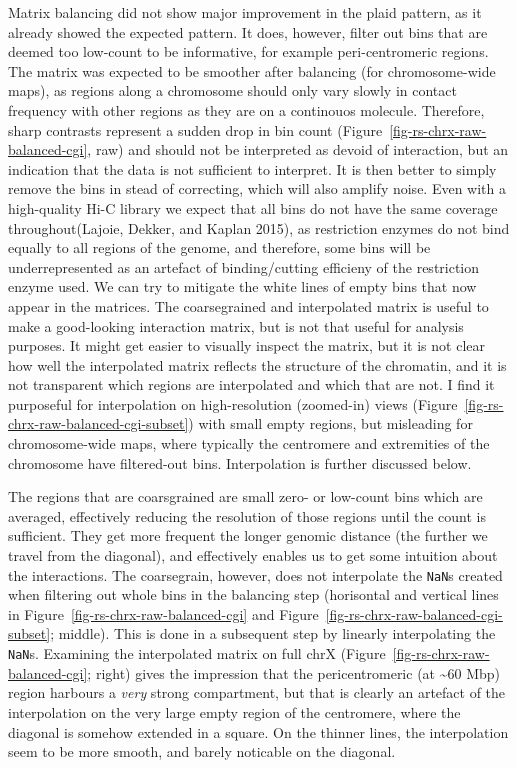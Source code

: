 \documentclass[
  11pt,
  a4paper,
]{scrbook}
\let\oldemph\emph
\renewcommand\emph[1]{\oldemph{\color{gray}#1}}
\begin{document}
Matrix balancing did not show major improvement in the plaid pattern, as
it already showed the expected pattern. It does, however, filter out
bins that are deemed too low-count to be informative, for example
peri-centromeric regions. The matrix was expected to be smoother after
balancing (for chromosome-wide maps), as regions along a chromosome
should only vary slowly in contact frequency with other regions as they
are on a continouos molecule. Therefore, sharp contrasts represent a
sudden drop in bin count (Figure~\ref{fig-rs-chrx-raw-balanced-cgi},
raw) and should not be interpreted as devoid of interaction, but an
indication that the data is not sufficient to interpret. It is then
better to simply remove the bins in stead of correcting, which will also
amplify noise. Even with a high-quality Hi-C library we expect that all
bins do not have the same coverage throughout(Lajoie, Dekker, and Kaplan
2015), as restriction enzymes do not bind equally to all regions of the
genome, and therefore, some bins will be underrepresented as an artefact
of binding/cutting efficieny of the restriction enzyme used. We can try
to mitigate the white lines of empty bins that now appear in the
matrices. The coarsegrained and interpolated matrix is useful to make a
good-looking interaction matrix, but is not that useful for analysis
purposes. It might get easier to visually inspect the matrix, but it is
not clear how well the interpolated matrix reflects the structure of the
chromatin, and it is not transparent which regions are interpolated and
which that are not. I find it purposeful for interpolation on
high-resolution (zoomed-in) views
(Figure~\ref{fig-rs-chrx-raw-balanced-cgi-subset}) with small empty
regions, but misleading for chromosome-wide maps, where typically the
centromere and extremities of the chromosome have filtered-out bins.
Interpolation is further discussed below.

The regions that are coarsgrained are small zero- or low-count bins
which are averaged, effectively reducing the resolution of those regions
until the count is sufficient. They get more frequent the longer genomic
distance (the further we travel from the diagonal), and effectively
enables us to get some intuition about the interactions. The
coarsegrain, however, does not interpolate the \texttt{NaN}s created
when filtering out whole bins in the balancing step (horisontal and
vertical lines in Figure~\ref{fig-rs-chrx-raw-balanced-cgi} and
Figure~\ref{fig-rs-chrx-raw-balanced-cgi-subset}; middle). This is done
in a subsequent step by linearly interpolating the \texttt{NaN}s.
Examining the interpolated matrix on full chrX
(Figure~\ref{fig-rs-chrx-raw-balanced-cgi}; right) gives the impression
that the pericentromeric (at \textasciitilde60 Mbp) region harbours a
\emph{very} strong compartment, but that is clearly an artefact of the
interpolation on the very large empty region of the centromere, where
the diagonal is somehow extended in a square. On the thinner lines, the
interpolation seem to be more smooth, and barely noticable on the
diagonal.
\end{document}
